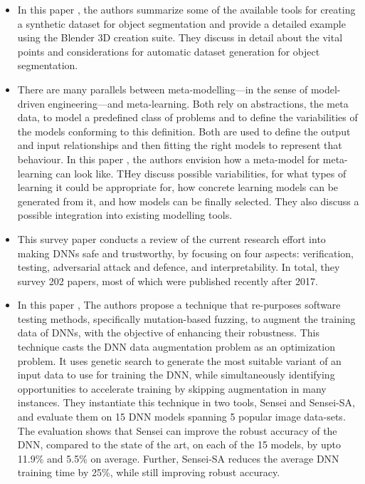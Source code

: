\documentclass[rnd]{mas_proposal}
\begin{document}
\begin{itemize}
    \item In this paper \cite{9780790}, the authors summarize some of the available tools for creating a synthetic dataset for object segmentation and provide a detailed example using the Blender 3D creation suite. They discuss in detail about the vital points and considerations for automatic dataset generation for object segmentation.
    
    \item There are many parallels between meta-modelling—in the sense of model-driven engineering—and meta-learning. Both rely on abstractions, the meta data, to model a predefined class of problems and to define the variabilities of the models conforming to this definition. Both are used to define the output and input relationships and then fitting the right models to represent that behaviour. In this paper \cite{8906948} , the authors envision how a meta-model for meta-learning can look like. THey discuss possible variabilities, for what types of learning it could be appropriate for, how concrete learning models can be generated from it, and how models can be finally selected. They also discuss a possible integration into existing modelling tools.
    
    \item This survey paper \cite{HUANG2020100270} conducts a review of the current research effort into making DNNs safe and trustworthy, by focusing on four aspects: verification, testing, adversarial attack and defence, and interpretability. In total, they survey 202 papers, most of which were published recently after 2017.
    
    \item In this paper \cite{9283925}, The authors propose a technique that re-purposes software testing methods, specifically mutation-based fuzzing, to augment the training data of DNNs, with the objective of enhancing their robustness. This technique casts the DNN data augmentation problem as an optimization problem. It uses genetic search to generate the most suitable variant of an input data to use for training the DNN, while simultaneously identifying opportunities to accelerate training by skipping augmentation in many instances. They instantiate this technique in two tools, Sensei and Sensei-SA, and evaluate them on 15 DNN models spanning 5 popular image data-sets. The evaluation shows that Sensei can improve the robust accuracy of the DNN, compared to the state of the art, on each of the 15 models, by upto 11.9\% and 5.5\% on average. Further, Sensei-SA reduces the average DNN training time by 25\%, while still improving robust accuracy.
    
\end{itemize}
\end{document}
